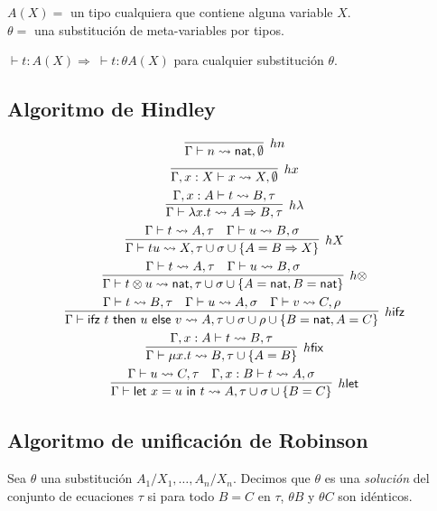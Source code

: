 \documentclass[twoside,a4paper,12pt]{article}
\theoremstyle{definition}
\theoremstyle{remark}
\newcommand\ifz[3]{\ensuremath{\mathsf{ifz~}#1\mathsf{~then~}#2\mathsf{~else~}#3}}
\newcommand\fun[2]{\ensuremath{\lambda {#1}{.}{#2}}}
\newcommand\fix[2]{\ensuremath{\mathsf{\mu}#1.#2}}
\newcommand\letl[3]{\ensuremath{\mathsf{let~}#1=#2\mathsf{~in~}#3}}
\newcommand\nat{\ensuremath{\mathsf{nat}}}
\begin{document}
\begin{definicion}{5.1}
  $A(X) = $ un tipo cualquiera que contiene alguna variable $X$. \\
  $\theta = $ una substitución de meta-variables por tipos.
\end{definicion}

\begin{teorema}{5.3}
  $\vdash t:A(X) \Rightarrow \ \vdash t:\theta A(X)$ para cualquier
  substitución $\theta$.
\end{teorema}

\subsection*{Algoritmo de Hindley}

\begin{gather*}
  \infer[hn]{\Gamma\vdash n\rightsquigarrow\nat,\emptyset}{} \\
  \infer[hx]{\Gamma,x:X\vdash x\rightsquigarrow X,\emptyset}{} \\
  \infer[h\lambda]
      {\Gamma\vdash\fun xt\rightsquigarrow A\Rightarrow B,\tau}
      {\Gamma,x:A\vdash t\rightsquigarrow B,\tau} \\
  \infer[hX]
      {\Gamma\vdash tu\rightsquigarrow X,\tau\cup\sigma\cup\{A=B\Rightarrow X\}}
      {\Gamma\vdash t\rightsquigarrow A,\tau & \Gamma\vdash u\rightsquigarrow B,\sigma } \\
  \infer[h\otimes]
      {\Gamma\vdash t\otimes u\rightsquigarrow\nat,\tau\cup\sigma\cup\{A=\nat,B=\nat\}}
      {\Gamma\vdash t\rightsquigarrow A,\tau & \Gamma\vdash u\rightsquigarrow B,\sigma } \\
  \infer[h\mathsf{ifz}]
      {\Gamma\vdash\ifz tuv\rightsquigarrow A,\tau\cup\sigma\cup\rho\cup\{B=\nat,A=C\}}
      {   \Gamma\vdash t\rightsquigarrow B,\tau
        & \Gamma\vdash u\rightsquigarrow A,\sigma
        & \Gamma\vdash v\rightsquigarrow C,\rho } \\
  \infer[h\mathsf{fix}]
      {\Gamma\vdash\fix xt\rightsquigarrow B,\tau\cup\{A=B\}}
      {\Gamma,x:A\vdash t\rightsquigarrow B,\tau} \\
  \infer[h\mathsf{let}]
      {\Gamma\vdash\letl xut\rightsquigarrow A,\tau\cup\sigma\cup\{B=C\}}
      {\Gamma\vdash u\rightsquigarrow C,\tau & \Gamma,x:B\vdash t\rightsquigarrow A,\sigma}
\end{gather*}

\subsection*{Algoritmo de unificación de Robinson}
\begin{definicion}
  Sea $\theta$ una substitución $A_1/X_1,\dots,A_n/X_n$. Decimos que $\theta$ es
  una \emph{solución} del conjunto de ecuaciones $\tau$ si para todo $B=C$ en
  $\tau$, $\theta B$ y $\theta C$ son idénticos.
\end{definicion}
\end{document}
